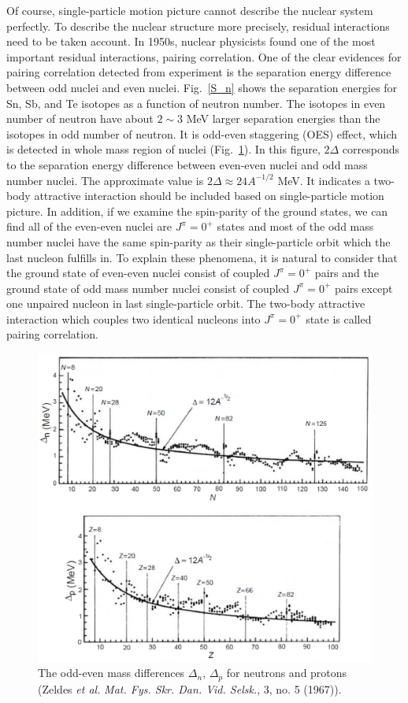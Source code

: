 \documentclass[11pt]{book} %
\begin{document}
Of course, single-particle motion picture cannot describe the nuclear system perfectly. To describe the nuclear structure more precisely, residual interactions need to be taken account. In 1950s, nuclear physicists found one of the most important residual interactions, pairing correlation. One of the clear evidences for pairing correlation detected from experiment is the separation energy difference between odd nuclei and even nuclei. Fig.~\ref{S_n} shows the separation energies for Sn, Sb, and Te isotopes as a function of neutron number. The isotopes in even number of neutron have about $2\sim3$ MeV larger separation energies than the isotopes in odd number of neutron.
It is odd-even staggering (OES) effect, which is detected in whole mass region of nuclei (Fig.~\ref{gap}). In this figure, $2\Delta$ corresponds to the separation energy difference between even-even nuclei and odd mass number nuclei. The approximate value is $2\Delta \approx 24A^{-1/2}$ MeV. It indicates a two-body attractive interaction should be included based on single-particle motion picture. In addition, if we examine the spin-parity of the ground states, we can find all of the even-even nuclei are $J^{\pi}=0^+$ states and most of the odd mass number nuclei have the same spin-parity as their single-particle orbit which the last nucleon fulfills in.
To explain these phenomena, it is natural to consider that the ground state of even-even nuclei consist of coupled $J^{\pi}=0^+$ pairs and the ground state of odd mass number nuclei consist of coupled $J^{\pi}=0^+$ pairs except one unpaired nucleon in last single-particle orbit. The two-body attractive interaction which couples two identical nucleons into $J^{\pi}=0^+$ state is called pairing correlation.

\begin{figure}[tb]
 \begin{center}
    \includegraphics[width=120mm]{images/gap.eps}
 \end{center}
  \caption{The odd-even mass differences $\Delta_n$, $\Delta_p$ for neutrons and protons (Zeldes {\it et al.} {\it Mat. Fys. Skr. Dan. Vid. Selsk.}, 3, no. 5 (1967)).}
  \label{gap}
\end{figure}
\end{document}
